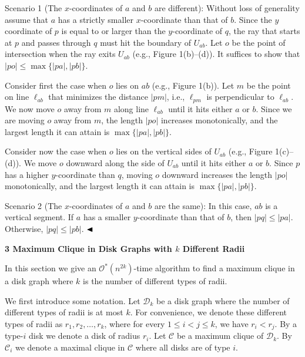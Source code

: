 \documentclass[10pt,a4paper]{amsart}
\begin{document}
\par
Scenario 1 (The $x$-coordinates of $a$ and $b$ are different): Without loss of generality assume that $a$ has a strictly smaller $x$-coordinate than that of $b$. Since the $y$ coordinate of $p$ is equal to or larger than the $y$-coordinate of $q$, the ray that starts at $p$ and passes through $q$ must hit the boundary of $U_{ab}$. Let $o$ be the point of intersection when the ray exits $U_{ab}$ (e.g., Figure 1(b)–(d)). It suffices to show that $|po|\leq\max\{|pa|,|pb|\}$.
\par
\par
Consider first the case when $o$ lies on $ab$ (e.g., Figure 1(b)). Let $m$ be the point on line $\ell_{ab}$ that minimizes the distance $|pm|$, i.e., $\ell_{pm}$ is perpendicular to $\ell_{ab}$. We now move $o$ away from $m$ along line $\ell_{ab}$ until it hits either $a$ or $b$. Since we are moving $o$ away from $m$, the length $|po|$ increases monotonically, and the largest length it can attain is $\max\{|pa|,|pb|\}$.
\par
\par
Consider now the case when $o$ lies on the vertical sides of $U_{ab}$ (e.g., Figure 1(c)–(d)). We move $o$ downward along the side of $U_{ab}$ until it hits either $a$ or $b$. Since $p$ has a higher $y$-coordinate than $q$, moving $o$ downward increases the length $|po|$ monotonically, and the largest length it can attain is $\max\{|pa|,|pb|\}$.
\par
\par
Scenario 2 (The $x$-coordinates of $a$ and $b$ are the same): In this case, $ab$ is a vertical segment. If $a$ has a smaller $y$-coordinate than that of $b$, then $|pq|\leq|pa|$. Otherwise, $|pq|\leq|pb|$. $\hfill\blacktriangleleft$
\par
\par
\par
\par\medskip\noindent\textbf{3 Maximum Clique in Disk Graphs with $k$ Different Radii}\par
In this section we give an $\mathcal{O}^{*}(n^{2k})$-time algorithm to find a maximum clique in a disk graph where $k$ is the number of different types of radii.
\par
\par
We first introduce some notation. Let $\mathcal{D}_{k}$ be a disk graph where the number of different types of radii is at most $k$. For convenience, we denote these different types of radii as $r_{1},r_{2},\ldots,r_{k}$, where for every $1\leq i<j\leq k$, we have $r_{i}<r_{j}$. By a type-$i$ disk we denote a disk of radius $r_{i}$. Let $\mathcal{C}$ be a maximum clique of $\mathcal{D}_{k}$. By $\mathcal{C}_{i}$ we denote a maximal clique in $\mathcal{C}$ where all disks are of type $i$.
\end{document}

